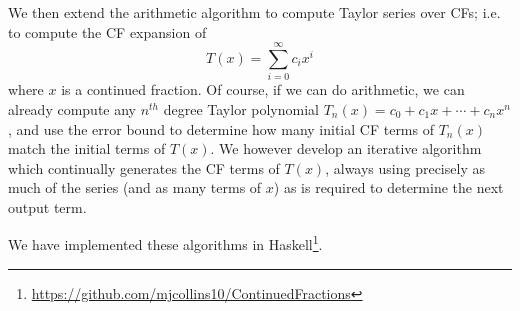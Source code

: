 \documentclass[11pt, oneside]{amsart}   	%
\renewcommand{\:}{\negthickspace:\negthickspace}
\begin{document}
We then extend the arithmetic algorithm to compute Taylor series over CFs; i.e. to compute the CF expansion of 
\[
T(x) = \sum_{i=0}^{\infty} c_ix^i
\]
where $x$ is a continued fraction.
Of course, if we can do arithmetic, we can already compute any $n^{th}$ degree Taylor polynomial $T_n(x) = c_0 + c_1x + \cdots + c_nx^n$, and use the error bound to determine how many initial CF terms of $T_n(x)$ match the initial terms of $T(x)$.
We however develop an iterative algorithm which continually generates the CF terms of $T(x)$, always using precisely as much of the series (and as many terms of $x$) as is required to determine the next output term.

We have implemented these algorithms
in Haskell\footnote{\href{https://github.com/mjcollins10/ContinuedFractions}{https://github.com/mjcollins10/ContinuedFractions}}.
\end{document}
